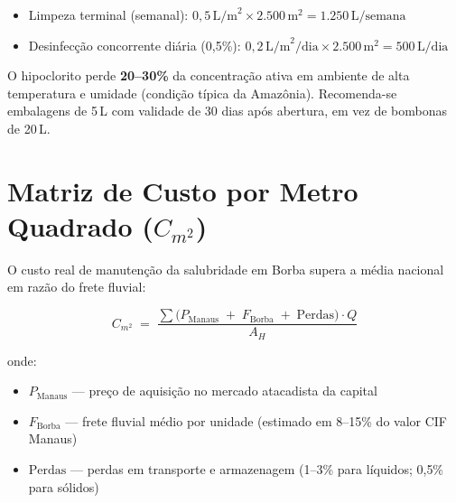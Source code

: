 \documentclass[12pt,a4paper]{article}
\begin{document}
\begin{itemize}
  \item Limpeza terminal (semanal): $0{,}5\,\text{L/m}^2 \times 2.500\,\text{m}^2 = 1.250\,\text{L/semana}$
  \item Desinfecção concorrente diária (0{,}5\%): $0{,}2\,\text{L/m}^2/\text{dia} \times 2.500\,\text{m}^2 = 500\,\text{L/dia}$
\end{itemize}

\begin{alertbox}
O hipoclorito perde \textbf{20--30\%} da concentração ativa em ambiente de alta temperatura e umidade (condição típica da Amazônia). Recomenda-se embalagens de 5\,L com validade de 30 dias após abertura, em vez de bombonas de 20\,L.
\end{alertbox}

\section{Matriz de Custo por Metro Quadrado (\texorpdfstring{$C_{m^2}$}{Cm2})}

O custo real de manutenção da salubridade em Borba supera a média nacional em razão do frete fluvial:

\begin{formulabox}
\[
  C_{m^2} \;=\; \frac{\displaystyle\sum \bigl(P_{\text{Manaus}} \;+\; F_{\text{Borba}} \;+\; \text{Perdas}\bigr) \cdot Q}{A_H}
\]
\end{formulabox}

\noindent onde:
\begin{itemize}
  \item $P_{\text{Manaus}}$ --- preço de aquisição no mercado atacadista da capital
  \item $F_{\text{Borba}}$ --- frete fluvial médio por unidade (estimado em 8--15\% do valor CIF Manaus)
  \item $\text{Perdas}$ --- perdas em transporte e armazenagem (1--3\% para líquidos; 0{,}5\% para sólidos)
\end{itemize}
\end{document}
